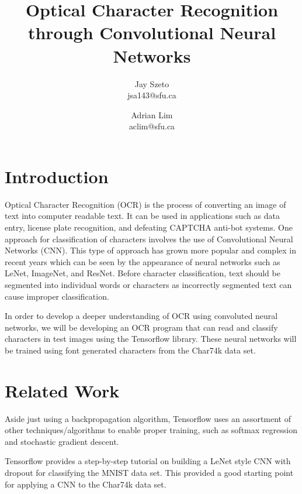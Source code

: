\documentclass[11pt]{article}
\title{Optical Character Recognition through Convolutional Neural Networks}
\author{Jay Szeto\\ jsa143@sfu.ca \and Adrian Lim\\ aclim@sfu.ca}
\begin{document}
\maketitle

\begin{abstract}
      
\end{abstract}

\hrulefill

\section{Introduction}
    Optical Character Recognition (OCR) is the process of converting an image of text into computer readable text.\cite{ocr_wiki_2017} It can be used in applications such as data entry, license plate recognition, and defeating CAPTCHA anti-bot systems.\cite{ocr_wiki_2017} One approach for classification of characters involves the use of Convolutional Neural Networks (CNN).\cite{lecun_bottou_bengio_haffner_1998} This type of approach has grown more popular and complex in recent years which can be seen by the appearance of neural networks such as LeNet, ImageNet, and ResNet. \cite{lecun_bottou_bengio_haffner_1998, image_net_2012, he2016deep} Before character classification, text should be segmented into individual words or characters as incorrectly segmented text can cause improper classification. \cite{shinde_textpre-processing}
    
    In order to develop a deeper understanding of OCR using convoluted neural networks, we will be developing an OCR program that can read and classify characters in test images using the Tensorflow library. \cite{tensorflow15-whitepaper} These neural networks will be trained using font generated characters from the Char74k data set. \cite{deCampos09}
    
\section{Related Work}
    Aside just using a backpropagation algorithm, Tensorflow uses an assortment of other techniques/algorithms to enable proper training, such as softmax regression and stochastic gradient descent.
    
    Tensorflow provides a step-by-step tutorial on building a LeNet style CNN with dropout for classifying the MNIST data set.\cite{tensorflow15-whitepaper, lecun_bottou_bengio_haffner_1998} This provided a good starting point for applying a CNN to the Char74k data set.
\end{document}
